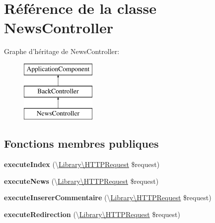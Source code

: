 \hypertarget{class_applications_1_1_frontend_1_1_modules_1_1_news_1_1_news_controller}{\section{Référence de la classe News\+Controller}
\label{class_applications_1_1_frontend_1_1_modules_1_1_news_1_1_news_controller}
}
Graphe d'héritage de News\+Controller\+:\begin{figure}[H]
\begin{center}
\leavevmode
\includegraphics[height=3.000000cm]{class_applications_1_1_frontend_1_1_modules_1_1_news_1_1_news_controller}
\end{center}
\end{figure}
\subsection*{Fonctions membres publiques}
\begin{DoxyCompactItemize}
\item 
\hypertarget{class_applications_1_1_frontend_1_1_modules_1_1_news_1_1_news_controller_ac9c6fe801e9ac09e4a395ad64c76ed04}{{\bfseries execute\+Index} (\textbackslash{}\hyperlink{class_library_1_1_h_t_t_p_request}{Library\textbackslash{}\+H\+T\+T\+P\+Request} \$request)}\label{class_applications_1_1_frontend_1_1_modules_1_1_news_1_1_news_controller_ac9c6fe801e9ac09e4a395ad64c76ed04}

\item 
\hypertarget{class_applications_1_1_frontend_1_1_modules_1_1_news_1_1_news_controller_a777f2ea5ffc7c96e829023afabc08c3b}{{\bfseries execute\+News} (\textbackslash{}\hyperlink{class_library_1_1_h_t_t_p_request}{Library\textbackslash{}\+H\+T\+T\+P\+Request} \$request)}\label{class_applications_1_1_frontend_1_1_modules_1_1_news_1_1_news_controller_a777f2ea5ffc7c96e829023afabc08c3b}

\item 
\hypertarget{class_applications_1_1_frontend_1_1_modules_1_1_news_1_1_news_controller_ac71edf1f6e921b1af19008cf4ee39a51}{{\bfseries execute\+Inserer\+Commentaire} (\textbackslash{}\hyperlink{class_library_1_1_h_t_t_p_request}{Library\textbackslash{}\+H\+T\+T\+P\+Request} \$request)}\label{class_applications_1_1_frontend_1_1_modules_1_1_news_1_1_news_controller_ac71edf1f6e921b1af19008cf4ee39a51}

\item 
\hypertarget{class_applications_1_1_frontend_1_1_modules_1_1_news_1_1_news_controller_a86811eb6355e8d70283899675731dc53}{{\bfseries execute\+Redirection} (\textbackslash{}\hyperlink{class_library_1_1_h_t_t_p_request}{Library\textbackslash{}\+H\+T\+T\+P\+Request} \$request)}\label{class_applications_1_1_frontend_1_1_modules_1_1_news_1_1_news_controller_a86811eb6355e8d70283899675731dc53}

\end{DoxyCompactItemize}
